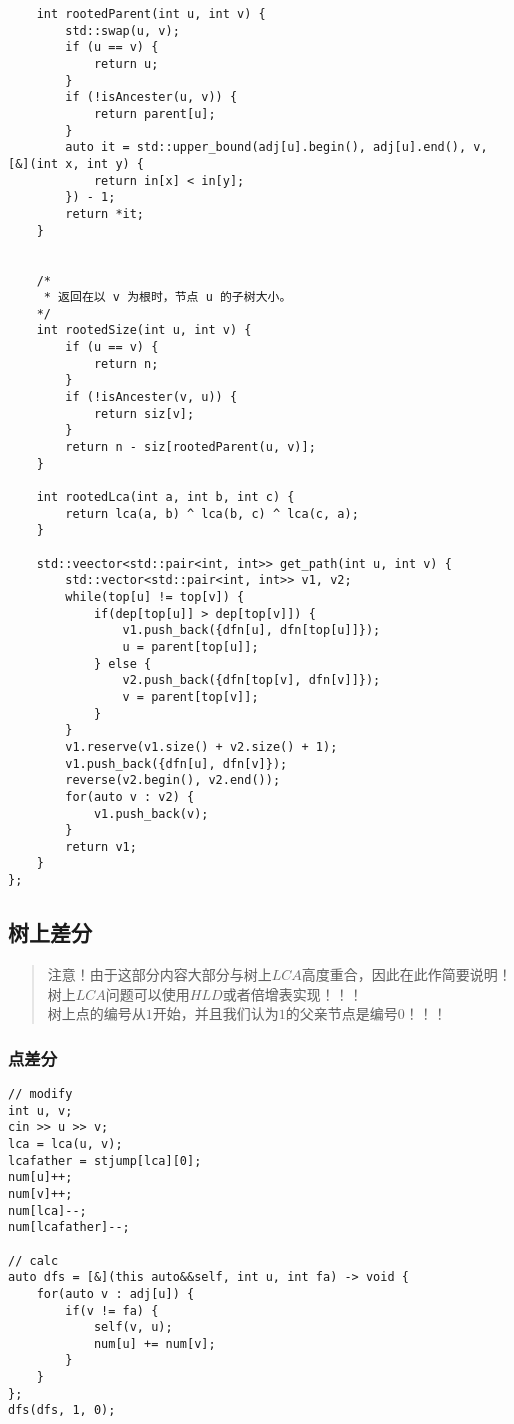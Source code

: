 \begin{lstlisting}
    int rootedParent(int u, int v) {
        std::swap(u, v);
        if (u == v) {
            return u;
        }
        if (!isAncester(u, v)) {
            return parent[u];
        }
        auto it = std::upper_bound(adj[u].begin(), adj[u].end(), v, [&](int x, int y) {
            return in[x] < in[y];
        }) - 1;
        return *it;
    }
    

    /*
     * 返回在以 v 为根时，节点 u 的子树大小。
    */
    int rootedSize(int u, int v) {
        if (u == v) {
            return n;
        }
        if (!isAncester(v, u)) {
            return siz[v];
        }
        return n - siz[rootedParent(u, v)];
    }
    
    int rootedLca(int a, int b, int c) {
        return lca(a, b) ^ lca(b, c) ^ lca(c, a);
    }

    std::veector<std::pair<int, int>> get_path(int u, int v) {
        std::vector<std::pair<int, int>> v1, v2;
        while(top[u] != top[v]) {
            if(dep[top[u]] > dep[top[v]]) {
                v1.push_back({dfn[u], dfn[top[u]]});
                u = parent[top[u]];
            } else {
                v2.push_back({dfn[top[v], dfn[v]]});
                v = parent[top[v]];
            }
        }
        v1.reserve(v1.size() + v2.size() + 1);
        v1.push_back({dfn[u], dfn[v]});
        reverse(v2.begin(), v2.end());
        for(auto v : v2) {
            v1.push_back(v);
        }
        return v1;
    }
};
\end{lstlisting}

\subsection{树上差分}

\begin{quote}
    注意！由于这部分内容大部分与树上$LCA$高度重合，因此在此作简要说明！ \\
    树上$LCA$问题可以使用$HLD$或者倍增表实现！！！ \\
    树上点的编号从$1$开始，并且我们认为$1$的父亲节点是编号$0$！！！
\end{quote}

\subsubsection{点差分}
\begin{lstlisting}
// modify
int u, v;
cin >> u >> v;
lca = lca(u, v);
lcafather = stjump[lca][0];
num[u]++;
num[v]++;
num[lca]--;
num[lcafather]--;

// calc
auto dfs = [&](this auto&&self, int u, int fa) -> void {
    for(auto v : adj[u]) {
        if(v != fa) {
            self(v, u);
            num[u] += num[v];
        }
    }
};
dfs(dfs, 1, 0);
\end{lstlisting}

